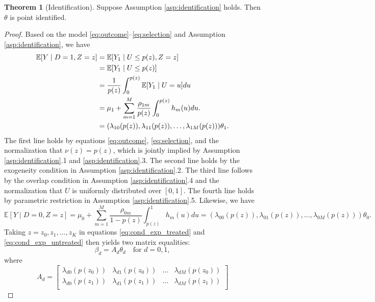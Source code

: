 \documentclass[11pt]{article}
\theoremstyle{definition}
\newtheorem{theorem}{Theorem}[section]
\newcommand{\Exp}{\ensuremath{\mathbb{E}}} %
\newcommand{\0}{\ensuremath{\mathbf{0}}}
\begin{document}
\begin{bibunit}
\clearpage

\begin{theorem}[Identification]
\label{thm:identification}
Suppose Assumption \ref{asp:identification} holds. Then $\theta$ is point identified.
\end{theorem}
\begin{proof}
	Based on the model \eqref{eq:outcome}--\eqref{eq:selection} and Assumption \ref{asp:identification}, we have
	\begin{align}
	\Exp[Y\mid D=1, Z=z] 
		&= \Exp[Y_1\mid U\leq p(z), Z=z] \notag \\
		&= \Exp[Y_1\mid U\leq p(z)] \notag \\
		&= \frac{1}{p(z)}\int_{0}^{p(z)} \Exp[Y_1\mid U=u] du \notag \\
		&= \mu_1 + \sum_{m=1}^M \frac{\rho_{1m}}{p(z)}\int_{0}^{p(z)} h_m(u) du. \notag \\
		&= (\lambda_{10}(p(z)), \lambda_{11}(p(z)), \ldots, \lambda_{1M}(p(z)))\theta_1. 	\label{eq:cond_exp_treated}
	\end{align}
	The first line holds by equations \eqref{eq:outcome}, \eqref{eq:selection}, and the normalization that $\nu(z) = p(z)$, which is jointly implied by Assumption \ref{asp:identification}.1 and \ref{asp:identification}.3. The second line holds by the exogeneity condition in Assumption \ref{asp:identification}.2. The third line follows by the overlap condition in Assumption \ref{asp:identification}.4 and the normalization that $U$ is uniformly distributed over $[0,1]$. The fourth line holds by parametric restriction in Assumption \ref{asp:identification}.5. Likewise, we have 
	\begin{equation}
	\label{eq:cond_exp_untreated}
	\Exp[Y\mid D=0, Z=z] = \mu_0 + \sum_{m=1}^M \frac{\rho_{0m}}{1-p(z)}\int_{p(z)}^{1} h_m(u) du = (\lambda_{00}(p(z)), \lambda_{01}(p(z)), \ldots, \lambda_{0M}(p(z)))\theta_0.
	\end{equation}
	Taking $z = z_0,z_1,\ldots,z_K$ in equations \eqref{eq:cond_exp_treated} and \eqref{eq:cond_exp_untreated} then yields two matrix equalities:
	\begin{equation}
	\label{eq:mateq}
		\beta_d = A_d\theta_d \quad \text{for } d = 0,1,
	\end{equation}
	where 
	\[
	A_d = 
	\begin{bmatrix}
		\lambda_{d0}(p(z_0)) & \lambda_{d1}(p(z_0)) & \ldots & \lambda_{dM}(p(z_0)) \\
		\lambda_{d0}(p(z_1)) & \lambda_{d1}(p(z_1)) & \ldots & \lambda_{dM}(p(z_1)) \\

\end{bmatrix}\]
\end{proof}
\end{bibunit}
\end{document}
